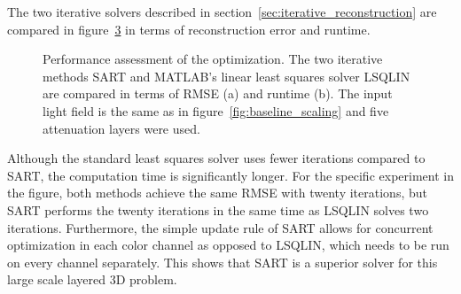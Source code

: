 The two iterative solvers described in section~\ref{sec:iterative_reconstruction} are compared in figure~\ref{fig:sart_vs_lsqlin} in terms of reconstruction error and runtime.
\begin{figure}[tb]
	\begin{subfigure}{0.5\textwidth}
		\centering
		
		\caption{}
		\label{fig:sart_lsqlin_iterations_vs_rmse}
	\end{subfigure}%
	\begin{subfigure}{0.5\textwidth}
		\centering
		
		\caption{}
		\label{fig:sart_lsqlin_iterations_vs_time}
	\end{subfigure}%
	\caption[Performance assessment of the optimization]
			{Performance assessment of the optimization.
			 The two iterative methods \mbox{SART} and \mbox{MATLAB's} linear least squares solver LSQLIN are compared in terms of \mbox{RMSE} (a) and runtime (b).
			 The input light field is the same as in figure~\ref{fig:baseline_scaling} and five attenuation layers were used.}
	\label{fig:sart_vs_lsqlin}
\end{figure}
Although the standard least squares solver uses fewer iterations compared to SART, the computation time is significantly longer.
For the specific experiment in the figure, both methods achieve the same RMSE with twenty iterations, but SART performs the twenty iterations in the same time as LSQLIN solves two iterations.
Furthermore, the simple update rule of SART allows for concurrent optimization in each color channel as opposed to LSQLIN, which needs to be run on every channel separately.
This shows that SART is a superior solver for this large scale layered 3D problem.

